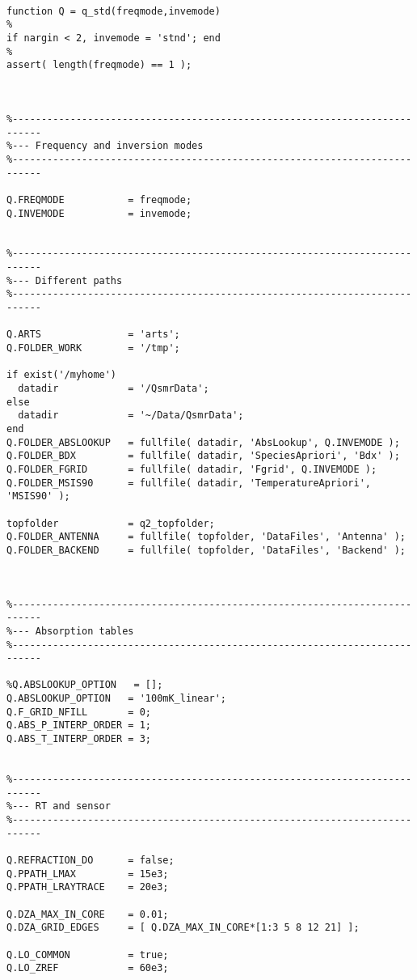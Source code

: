 \begin{verbatim}

function Q = q_std(freqmode,invemode)
%
if nargin < 2, invemode = 'stnd'; end
%
assert( length(freqmode) == 1 );



%---------------------------------------------------------------------------
%--- Frequency and inversion modes
%---------------------------------------------------------------------------

Q.FREQMODE           = freqmode;  
Q.INVEMODE           = invemode;


%---------------------------------------------------------------------------
%--- Different paths
%---------------------------------------------------------------------------

Q.ARTS               = 'arts';
Q.FOLDER_WORK        = '/tmp';

if exist('/myhome')
  datadir            = '/QsmrData';    
else
  datadir            = '~/Data/QsmrData';
end
Q.FOLDER_ABSLOOKUP   = fullfile( datadir, 'AbsLookup', Q.INVEMODE );  
Q.FOLDER_BDX         = fullfile( datadir, 'SpeciesApriori', 'Bdx' );  
Q.FOLDER_FGRID       = fullfile( datadir, 'Fgrid', Q.INVEMODE );  
Q.FOLDER_MSIS90      = fullfile( datadir, 'TemperatureApriori', 'MSIS90' );  

topfolder            = q2_topfolder;
Q.FOLDER_ANTENNA     = fullfile( topfolder, 'DataFiles', 'Antenna' );  
Q.FOLDER_BACKEND     = fullfile( topfolder, 'DataFiles', 'Backend' );  



%---------------------------------------------------------------------------
%--- Absorption tables
%---------------------------------------------------------------------------

%Q.ABSLOOKUP_OPTION   = [];
Q.ABSLOOKUP_OPTION   = '100mK_linear';
Q.F_GRID_NFILL       = 0;
Q.ABS_P_INTERP_ORDER = 1;
Q.ABS_T_INTERP_ORDER = 3;
  
  
%---------------------------------------------------------------------------
%--- RT and sensor
%---------------------------------------------------------------------------

Q.REFRACTION_DO      = false;  
Q.PPATH_LMAX         = 15e3;
Q.PPATH_LRAYTRACE    = 20e3;

Q.DZA_MAX_IN_CORE    = 0.01;
Q.DZA_GRID_EDGES     = [ Q.DZA_MAX_IN_CORE*[1:3 5 8 12 21] ];

Q.LO_COMMON          = true;
Q.LO_ZREF            = 60e3;


\end{verbatim}
